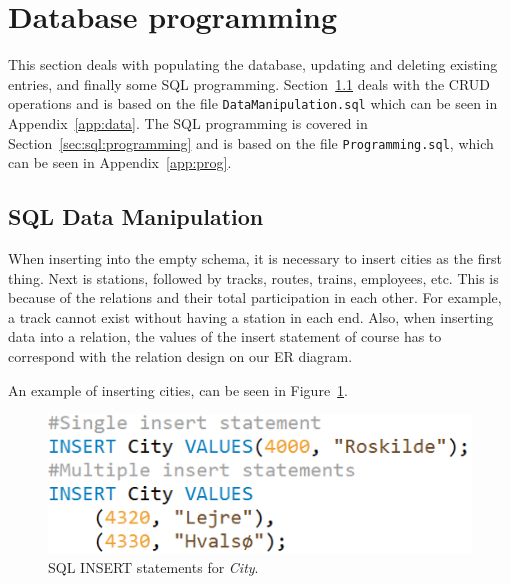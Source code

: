 \section{Database programming}\label{sec:prog}
This section deals with populating the database, updating and deleting existing 
entries, and finally some SQL programming. Section~\ref{sec:manipulate} deals 
with the CRUD operations and is based on the file \verb|DataManipulation.sql| 
which can be seen in Appendix~\ref{app:data}. The SQL programming is covered in 
Section~\ref{sec:sql:programming} and is based on the file 
\verb|Programming.sql|, which can be seen in Appendix~\ref{app:prog}.

\subsection{SQL Data Manipulation} \label{sec:manipulate}
When inserting into the empty schema, it is necessary to insert cities as the 
first thing. Next is stations, followed by tracks, routes, trains, employees, 
etc. This is because of the relations and their total participation in each 
other. For example, a track cannot exist without having a station in each 
end.
Also, when inserting data into a relation, the values of the insert statement 
of course has to correspond with the relation design on our ER diagram.

An example of inserting cities, can  be seen in Figure~\ref{fig:ins:city}.



\begin{figure}[h]
    \centering
    \includegraphics[scale=.5]{img/INSERT_Statements}
    \caption{SQL INSERT statements for \emph{City}.}
    \label{fig:ins:city}
\end{figure}

